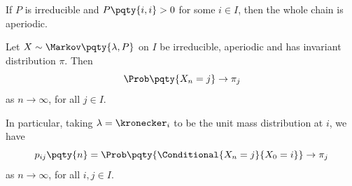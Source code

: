 \begin{example}
    If \(P\) is irreducible and \(P\pqty{i, i} > 0\) for some \(i \in I\), then the whole chain is aperiodic.
\end{example}

\begin{theorem}
    Let \(X \sim \Markov\pqty{\lambda, P}\) on \(I\) be irreducible, aperiodic and has invariant distribution \(\pi\). Then
    \[
        \Prob\pqty{X_n = j} \to \pi_j
    \]
    as \(n \to \infty\), for all \(j \in I\).

    In particular, taking \(\lambda = \kronecker_i\) to be the unit mass distribution at \(i\), we have
    \[
        p_{ij} \pqty{n} = \Prob\pqty{\Conditional{X_n = j}{X_0 = i}} \to \pi_j
    \]
    as \(n \to \infty\), for all \(i, j \in I\).
\end{theorem}

